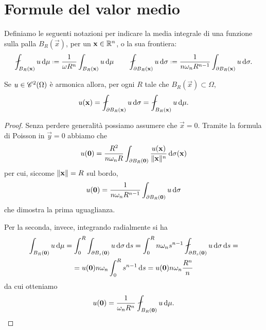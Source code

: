 \section{Formule del valor medio}
Definiamo le seguenti notazioni per indicare la media integrale di una funzione sulla palla $B_R(\vec x)$, per un $\vec x\in\R^n$, o la sua frontiera:
\begin{equation}
    \avint_{B_R(\vec x)}u\,\dd\mu\defeq\frac1{\omega R^n}\int_{B_R(\vec x)}u\,\dd\mu
    \qquad
    \avint_{\boundary B_R(\vec x)}u\,\dd\sigma\defeq\frac1{n\omega_nR^{n-1}}\int_{\boundary B_R(\vec x)}u\,\dd\sigma.
\end{equation}
\begin{teorema} \label{t:valor-medio-laplace}
    Se $u\in\cont[2]{\Omega}$ è armonica allora, per ogni $R$ tale che $B_R(\vec x)\subset\Omega$,
    \begin{equation}
        u(\vec x)=\avint_{\boundary B_R(\vec x)} u\,\dd\sigma=\avint_{B_R(\vec x)} u\,\dd\mu.
    \end{equation}
\end{teorema}
\begin{proof}
    Senza perdere generalità possiamo assumere che $\vec x=0$.
    Tramite la formula di Poisson in $\vec y=0$ abbiamo che
    \begin{equation}
        u(\vec 0)=\frac{R^2}{n\omega_n R}\int_{\boundary B_R(\vec 0)}\frac{u(\vec x)}{\norm{\vec x}^n}\,\dd\sigma(\vec x)
    \end{equation}
    per cui, siccome $\norm{\vec x}=R$ sul bordo,
    \begin{equation}
        u(\vec 0)=\frac1{n\omega_n R^{n-1}}\int_{\boundary B_R(\vec 0)}u\,\dd\sigma
    \end{equation}
    che dimostra la prima uguaglianza.
    
    Per la seconda, invece, integrando radialmente si ha
    \begin{multline}
        \int_{B_R(\vec 0)} u\,\dd\mu=
        \int_0^R\int_{\boundary B_s(\vec 0)} u\,\dd\sigma\,\dd s=
        \int_0^R n\omega_n s^{n-1}\avint_{\boundary B_s(\vec 0)} u\,\dd\sigma\,\dd s=\\=
        u(\vec 0)n\omega_n \int_0^R s^{n-1}\,\dd s=
        u(\vec 0)n\omega_n\frac{R^n}{n}
    \end{multline}
    da cui otteniamo
    \begin{equation}
        u(\vec 0)=\frac1{\omega_nR^n}\avint_{B_R(\vec 0)} u\,\dd\mu.\qedhere
    \end{equation}
\end{proof}
